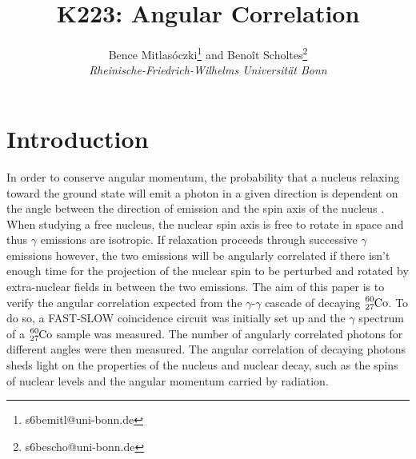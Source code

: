 \documentclass[twocolumn]{article}
\title{\textbf{K223: Angular Correlation}}
\author{Bence Mitlasóczki\thanks{s6bemitl@uni-bonn.de} and Beno\^it Scholtes\thanks{s6bescho@uni-bonn.de} \\ \textit{Rheinische-Friedrich-Wilhelms Universit\"at Bonn}}
\begin{document}
\renewcommand{\abstractname}{\vspace{-\baselineskip}} %
\twocolumn[ %
\begin{@twocolumnfalse}
\maketitle
\begin{abstract} \vspace{-10mm}
This paper analyses the angular correlation between subsequent photon emissions in the $\gamma$-$\gamma$ cascade of decaying $\ce{_27^{60}Co}$. A fast-slow coincidence circuit with scintillation detectors, single channel analysers, and constant fraction discriminators were used measure the number of $\gamma$-$\gamma$ cascade decays for angular separations from 90$^\circ$ to 270$^\circ$. The data was corrected for the measured accidental coincidences. The data was in agreement with the theoretical angular correlation function and its coefficients. The fit coefficient values calculated are $B = 0.116  \pm 0.066 $ and $C = 0.040 \pm 0.075$. The large uncertainty is to be expected from previous experiments.
\end{abstract}
\end{@twocolumnfalse}
\hspace{5mm} ]
\maketitle
\saythanks %
\section{Introduction}
In order to conserve angular momentum, the probability that a nucleus relaxing toward the ground state will emit a photon in a given direction is dependent on the angle between the direction of emission and the spin axis of the nucleus \cite{sieg}. When studying a free nucleus, the nuclear spin axis is free to rotate in space and thus $\gamma$ emissions are isotropic. If relaxation proceeds through successive $\gamma$ emissions however, the two emissions will be angularly correlated if there isn't enough time for the projection of the nuclear spin to be perturbed and rotated by extra-nuclear fields in between the two emissions. The aim of this paper is to verify the angular correlation expected from the $\gamma$-$\gamma$ cascade of decaying $\ce{_27^{60}Co}$. To do so, a FAST-SLOW coincidence circuit was initially set up and the $\gamma$ spectrum of a $\ce{_27^{60}Co}$ sample was measured. The number of angularly correlated photons for different angles were then measured. The angular correlation of decaying photons sheds light on the properties of the nucleus and nuclear decay, such as the spins of nuclear levels and the angular momentum carried by radiation. 
\end{document}

